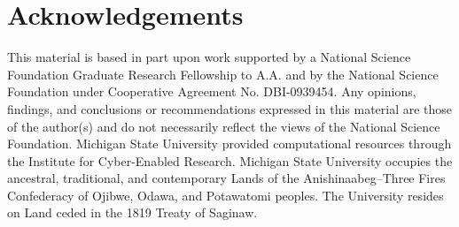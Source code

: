 \section{Acknowledgements}%

This material is based in part upon work supported by a National Science Foundation Graduate Research Fellowship to A.A. and by the National Science Foundation under Cooperative Agreement No. DBI-0939454. 
Any opinions, findings, and conclusions or recommendations expressed in this material are those of the author(s) and do not necessarily reflect the views of the National Science Foundation. 
Michigan State University provided computational resources through the Institute for Cyber-Enabled Research. 
Michigan State University occupies the ancestral, traditional, and contemporary Lands of the Anishinaabeg–Three Fires Confederacy of Ojibwe, Odawa, and Potawatomi peoples. 
The University resides on Land ceded in the 1819 Treaty of Saginaw.